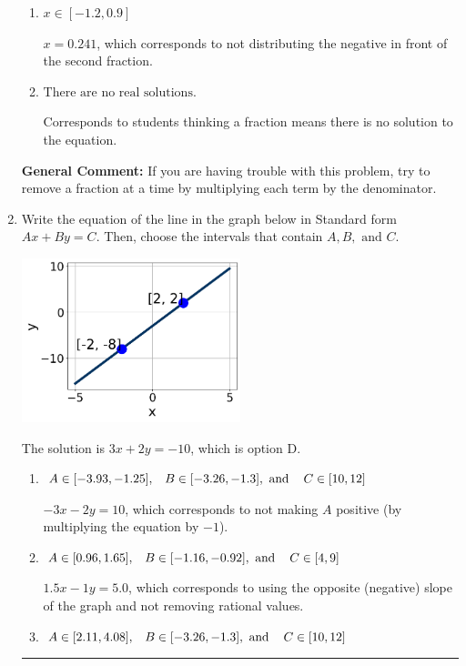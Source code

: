 \documentclass{extbook}[14pt]
\newcommand{\litem}[1]{\item #1

\rule{\textwidth}{0.4pt}}
\begin{document}
\begin{enumerate}
{\begin{enumerate}[label=\Alph*.]
 $x = 9.333$, which corresponds to dividing the coefficients in front of x by the denominator rather than dividing BOTH parts of the numerator by the denominator (or removing the fractions through multiplication).
\item \( x \in [-1.2, 0.9] \)

 $x = 0.241$, which corresponds to not distributing the negative in front of the second fraction.
\item \( \text{There are no real solutions.} \)

Corresponds to students thinking a fraction means there is no solution to the equation.
\end{enumerate}

\textbf{General Comment:} If you are having trouble with this problem, try to remove a fraction at a time by multiplying each term by the denominator.
}
\litem{
Write the equation of the line in the graph below in Standard form $Ax+By=C$. Then, choose the intervals that contain $A, B, \text{ and } C$.

\begin{center}
    \includegraphics[width=0.5\textwidth]{../Figures/linearGraphToStandardCopyA.png}
\end{center}


The solution is \( 3x + 2y = -10 \), which is option D.\begin{enumerate}[label=\Alph*.]
\item \( A \in [-3.93, -1.25], \hspace{3mm} B \in [-3.26, -1.3], \text{ and } \hspace{3mm} C \in [10, 12] \)

 $-3x - 2y = 10$, which corresponds to not making $A$ positive (by multiplying the equation by $-1$).
\item \( A \in [0.96, 1.65], \hspace{3mm} B \in [-1.16, -0.92], \text{ and } \hspace{3mm} C \in [4, 9] \)

 $1.5x - 1y = 5.0$, which corresponds to using the opposite (negative) slope of the graph and not removing rational values.
\item \( A \in [2.11, 4.08], \hspace{3mm} B \in [-3.26, -1.3], \text{ and } \hspace{3mm} C \in [10, 12] \)


\end{enumerate}}
\end{enumerate}
\end{document}
